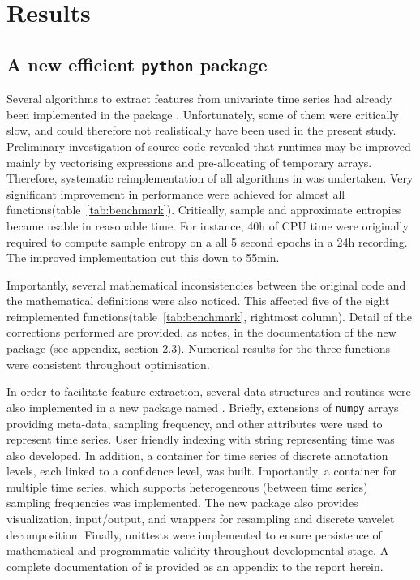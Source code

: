 
\section{Results} \label{results}

\subsection{A new efficient \texttt{python} package}
Several algorithms to extract features from univariate time series had already
been implemented in the \py{} package \pyeeg{}\cite{bao_pyeeg:_2011}.
Unfortunately, some of them were critically slow, and could therefore not realistically have been used in the present study.
Preliminary investigation of \pyeeg{} source code revealed that runtimes may be improved mainly by vectorising expressions and pre-allocating of temporary arrays.
Therefore, systematic reimplementation of all algorithms in \pyeeg{} was undertaken.
Very significant improvement in performance were achieved for almost all functions(table~\ref{tab:benchmark}).
Critically, sample and approximate entropies\cite{richman_physiological_2000} became usable in
reasonable time.
For instance, 40h of CPU time were originally required to compute sample entropy on a all 5 second epochs in a 24h recording.
The improved implementation cut this down to 55min.


Importantly, several mathematical inconsistencies between the original code and the mathematical definitions were also noticed.
This affected five of the eight reimplemented functions(table~\ref{tab:benchmark}, rightmost column).
Detail of the corrections performed are provided, as notes, in the documentation of the new package (see appendix, section 2.3).
Numerical results for the three  functions were consistent throughout optimisation.

In order to facilitate feature extraction, several data structures and routines were also implemented
in a new \py{} package named \pr{}.
Briefly, extensions of \texttt{numpy} arrays\cite{walt_numpy_2011} providing
meta-data, sampling frequency, and other attributes were used to represent time series.
User friendly indexing with string representing time was also developed.
In addition, a container for time series of discrete annotation levels, each linked to a confidence level, was built.
Importantly, a container for multiple time series, which supports heterogeneous (between time series) sampling frequencies was implemented.
The new package also provides visualization, input/output, and wrappers for resampling and discrete wavelet decomposition.
Finally, unittests were implemented to ensure persistence of mathematical and programmatic validity throughout developmental stage.
A complete documentation of \pr{} is provided as an appendix to the report herein.

